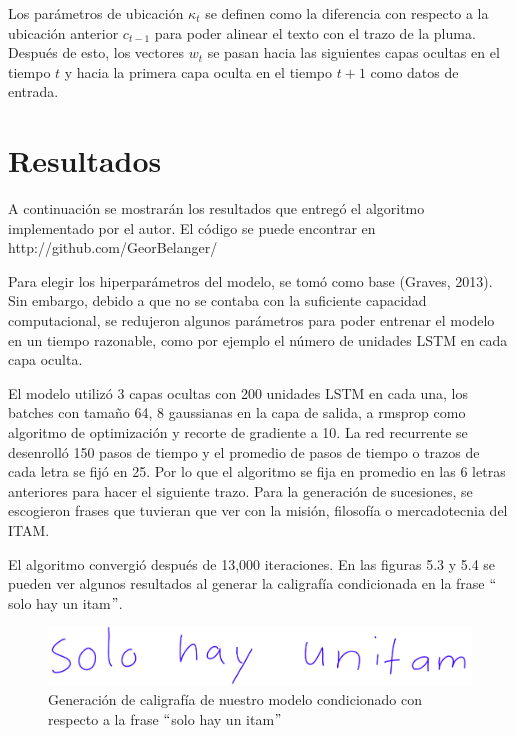 Los parámetros de ubicación $\kappa_t$ se definen como la diferencia con respecto a la ubicación anterior $c_{t-1}$ para poder alinear el texto con el trazo de la pluma. Después de esto, los vectores $w_t$ se pasan hacia las siguientes capas ocultas en el tiempo $t$ y hacia la primera capa oculta en el tiempo $t+1$ como datos de entrada.


\section{Resultados}

A continuación se mostrarán los resultados que entregó el algoritmo implementado por el autor. El código se puede encontrar en http://github.com/GeorBelanger/

\vspace{1em}

Para elegir los hiperparámetros del modelo, se tomó como base (Graves, 2013). Sin embargo, debido a que no se contaba con la suficiente capacidad computacional, se redujeron algunos parámetros para poder entrenar el modelo en un tiempo razonable, como por ejemplo el número de unidades LSTM en cada capa oculta.

\vspace{1em}

El modelo utilizó 3 capas ocultas con 200 unidades LSTM en cada una, los batches con tamaño 64, 8 gaussianas en la capa de salida, a rmsprop como algoritmo de optimización y recorte de gradiente a 10. La red recurrente se desenrolló 150 pasos de tiempo y el promedio de pasos de tiempo o trazos de cada letra se fijó en 25. Por lo que el algoritmo se fija en promedio en las 6 letras anteriores para hacer el siguiente trazo. Para la generación de sucesiones, se escogieron frases que tuvieran que ver con la misión, filosofía o mercadotecnia del ITAM.

\vspace{1em}

 El algoritmo convergió después de 13,000 iteraciones. En las figuras 5.3 y 5.4 se pueden ver algunos resultados al generar la caligrafía condicionada en la frase $``$solo hay un itam$"$.
 
\begin{figure}[h]
\begin{center}
\includegraphics[width=150mm, scale = 0.8]{./imag/solohay1.png}
\end{center}
\caption{Generación de caligrafía de nuestro modelo condicionado con respecto a la frase $``$solo hay un itam$"$}
\end{figure}

